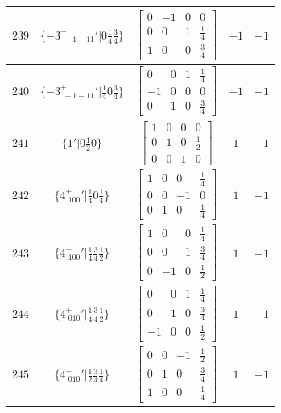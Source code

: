 \documentclass[fleqn,8pt]{jsarticle}
\begin{document}
\begin{longtable}{ccccc}
$ 239 $ & $ \{-3^{-}_{\,\,-1-11}{}'|0 \frac{1}{4} \frac{3}{4}\} $ & $ \begin{bmatrix} 0 & -1 & 0 & 0 \\ 0 & 0 & 1 & \frac{1}{4} \\ 1 & 0 & 0 & \frac{3}{4} \end{bmatrix} $ & $ -1 $ & $ -1 $ \\ \hline
$ 240 $ & $ \{-3^{+}_{\,\,-1-11}{}'|\frac{1}{4} 0 \frac{3}{4}\} $ & $ \begin{bmatrix} 0 & 0 & 1 & \frac{1}{4} \\ -1 & 0 & 0 & 0 \\ 0 & 1 & 0 & \frac{3}{4} \end{bmatrix} $ & $ -1 $ & $ -1 $ \\ \hline
$ 241 $ & $ \{1{}'|0 \frac{1}{2} 0\} $ & $ \begin{bmatrix} 1 & 0 & 0 & 0 \\ 0 & 1 & 0 & \frac{1}{2} \\ 0 & 0 & 1 & 0 \end{bmatrix} $ & $ 1 $ & $ -1 $ \\ \hline
$ 242 $ & $ \{4^{+}_{\,\,100}{}'|\frac{1}{4} 0 \frac{1}{4}\} $ & $ \begin{bmatrix} 1 & 0 & 0 & \frac{1}{4} \\ 0 & 0 & -1 & 0 \\ 0 & 1 & 0 & \frac{1}{4} \end{bmatrix} $ & $ 1 $ & $ -1 $ \\ \hline
$ 243 $ & $ \{4^{-}_{\,\,100}{}'|\frac{1}{4} \frac{3}{4} \frac{1}{2}\} $ & $ \begin{bmatrix} 1 & 0 & 0 & \frac{1}{4} \\ 0 & 0 & 1 & \frac{3}{4} \\ 0 & -1 & 0 & \frac{1}{2} \end{bmatrix} $ & $ 1 $ & $ -1 $ \\ \hline
$ 244 $ & $ \{4^{+}_{\,\,010}{}'|\frac{1}{4} \frac{3}{4} \frac{1}{2}\} $ & $ \begin{bmatrix} 0 & 0 & 1 & \frac{1}{4} \\ 0 & 1 & 0 & \frac{3}{4} \\ -1 & 0 & 0 & \frac{1}{2} \end{bmatrix} $ & $ 1 $ & $ -1 $ \\ \hline
$ 245 $ & $ \{4^{-}_{\,\,010}{}'|\frac{1}{2} \frac{3}{4} \frac{1}{4}\} $ & $ \begin{bmatrix} 0 & 0 & -1 & \frac{1}{2} \\ 0 & 1 & 0 & \frac{3}{4} \\ 1 & 0 & 0 & \frac{1}{4} \end{bmatrix} $ & $ 1 $ & $ -1 $ \\ \hline

\end{longtable}
\end{document}
